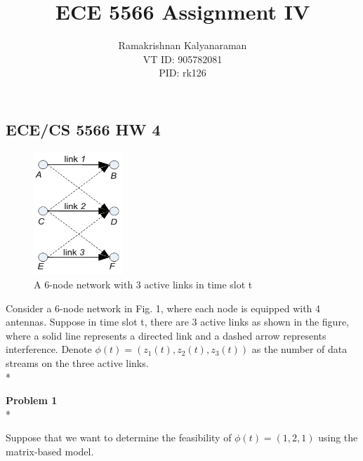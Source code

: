 \documentclass[a4paper,oneside,12pt]{report}
\begin{document}
\pagestyle{empty} %



\title{ECE 5566 Assignment IV}
\author{Ramakrishnan Kalyanaraman\\
VT ID: 905782081\\
PID: rk126}
\maketitle

\begin{center}
	\section*{ECE/CS 5566 HW 4}
\end{center}

\begin{figure}[h!]
  \centering
    \includegraphics[width=0.3\textwidth]{fig_1}
	\caption{A 6-node network with 3 active links in time slot t}
\end{figure}

Consider a 6-node network in Fig. 1, where each node is equipped with 4 antennas. Suppose in time slot t, there are 3 active links as shown in the figure, where a solid line represents a directed link and a dashed arrow represents interference. Denote $\phi(t)=(z_1 (t),z_2 (t),z_3 (t))$ as the number of data streams on the three active links.	\\*

\textbf{Problem 1}	\\*

Suppose that we want to determine the feasibility of $\phi(t)=(1,2,1)$ using the matrix-based model.
\end{document}
